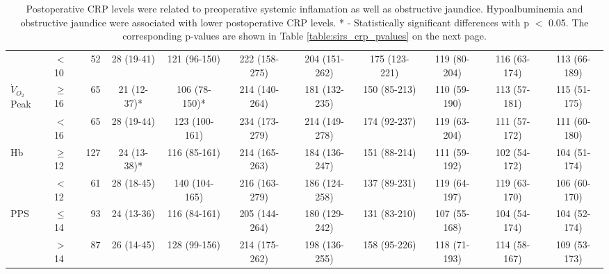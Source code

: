 \begin{sidewaystable}[p]
\begin{tabular}{|llr | cccccccc|}
		                    & $<$10    &  52 & 28 (19-41)  & 121 (96-150)  & 222 (158-275)  & 204 (151-262)  & 175 (123-221)  & 119 (80-204)  & 116 (63-174)  & 113 (66-189)  \\
		$\dot{V}_{O_2}$Peak & $\geq$16 &  65 & 21 (12-37)* & 106 (78-150)* & 214 (140-264)  & 181 (132-235)  &  150 (85-213)  & 110 (59-190)  & 113 (57-181)  & 115 (51-175)  \\
		                    & $<$16    &  65 & 28 (19-44)  & 123 (100-161) & 234 (173-279)  & 214 (149-278)  &  174 (92-237)  & 119 (63-204)  & 111 (57-172)  & 111 (60-180)  \\
		Hb                  & $\geq$12 & 127 & 24 (13-38)* & 116 (85-161)  & 214 (165-263)  & 184 (136-247)  &  151 (88-214)  & 111 (59-192)  & 102 (54-172)  & 104 (51-174)  \\
		                    & $<$12    &  61 & 28 (18-45)  & 140 (104-165) & 216 (163-279)  & 186 (124-258)  &  137 (89-231)  & 119 (64-197)  & 119 (63-170)  & 106 (60-170)  \\
		PPS                 & $\leq$14 &  93 & 24 (13-36)  & 116 (84-161)  & 205 (144-264)  & 180 (129-242)  &  131 (83-210)  & 107 (55-168)  & 104 (54-174)  & 104 (52-174)  \\
		                    & $>$14    &  87 & 26 (14-45)  & 128 (99-156)  & 214 (175-262)  & 198 (136-255)  &  158 (95-226)  & 118 (71-193)  & 114 (58-167)  & 109 (53-173)  \\ \hline
	\end{tabular}
	\caption*{Postoperative CRP levels were related to preoperative systemic inflamation as well as obstructive jaundice. 
	Hypoalbuminemia and obstructive jaundice were associated with lower postoperative CRP levels. 
	* - Statistically significant differences with p $<$ 0.05. The corresponding p-values are shown in Table \ref{table:sirs_crp_pvalues} on the next page.}
\end{sidewaystable}































